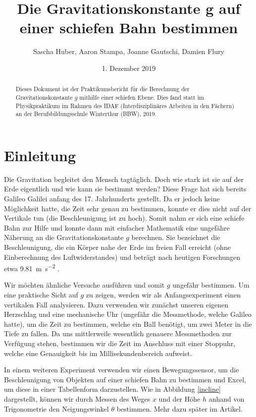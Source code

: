 \documentclass[a4paper, titlepage]{article}
\title{Die Gravitationskonstante g
auf einer schiefen Bahn bestimmen}
\author{Sascha Huber, Aaron Stampa, Joanne Gautschi, Damien Flury}
\date{1. Dezember 2019}
\newcommand{\accunit}[1]{\SI{#1}{\metre\per\square\second}}
\begin{document}
    \maketitle
    \begin{abstract}
       Dieses Dokument ist der Praktikumsbericht für die Berechnung
       der Gravitationskonstante $g$ mithilfe einer schiefen Ebene.
       Dies fand statt im Physikpraktikum im Rahmen des IDAF
       (Interdisziplinäres Arbeiten in den Fächern) an der
       Berufsbildungsschule Winterthur (BBW), 2019.
    \end{abstract}
    \tableofcontents
    \newpage



    \section{Einleitung}
    Die Gravitation begleitet den Mensch tagtäglich. Doch wie stark
    ist sie auf der Erde eigentlich und wie kann sie bestimmt werden?
    Diese Frage hat sich bereits Galileo Galilei anfang des 17. Jahrhunderts
    gestellt. Da er jedoch keine Möglichkeit hatte, die
    Zeit sehr genau zu bestimmen, konnte er dies nicht auf der
    Vertikale tun (die Beschleunigung ist zu hoch). Somit nahm er
    sich eine schiefe Bahn zur Hilfe und konnte dann mit einfacher
    Mathematik eine ungefähre Näherung an die Gravitationskonstante $g$
    berechnen. Sie bezeichnet die Beschleunigung, die ein Körper nahe
    der Erde im freien Fall erreicht (ohne Einberechnung des 
    Luftwiderstandes) und beträgt nach heutigen Forschungen
    etwa \accunit{9.81} \cite{physicsbook}.

    Wir möchten ähnliche Versuche ausführen und somit $g$ ungefähr bestimmen. 
    Um eine praktische Sicht auf $g$ zu zeigen, werden wir als Anfangsexperiment einen
    vertikalen Fall analysieren. Dazu verwenden wir zunächst unseren eigenen
    Herzschlag und eine mechanische Uhr (ungefähr die Messmethode, 
    welche Galileo hatte), um die Zeit zu bestimmen, welche ein Ball
    benötigt, um zwei Meter in die Tiefe zu fallen. Da uns mittlerweile
    wesentlich genauere Messmethoden zur Verfügung stehen, bestimmen wir
    die Zeit im Anschluss mit einer Stoppuhr, welche eine Genauigkeit bis im 
    Millisekundenbereich aufweist.
    
    In einem weiteren Experiment verwenden wir einen Bewegungssensor, um
    die Beschleunigung von Objekten auf einer schiefen Bahn zu bestimmen
    und Excel, um diese in einer Tabellenform darzustellen. Wie in 
    Abbildung \ref{incline} dargestellt, können wir durch Messen des
    Weges $x$ und der Höhe $h$ anhand von Trigonometrie den Neigungswinkel
    $\theta$ bestimmen. Mehr dazu später im Artikel.
\end{document}
